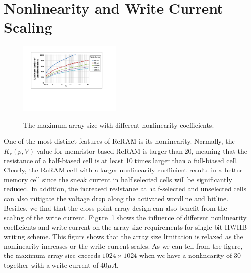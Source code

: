 \section{Nonlinearity and Write Current Scaling}\label{sec:scale}
\begin{figure}[!b]
\centering
  \includegraphics[width=0.45\textwidth]{./figures/non_linear_f}\\
  \vspace{-5pt}
  \caption{The maximum array size with different nonlinearity coefficients.}\label{fig:non_linear}
\end{figure}
One of the most distinct features of ReRAM is its nonlinearity. Normally,
the $K_r(p,V)$ value for memristor-based ReRAM is larger than 20, meaning
that the resistance of a half-biased cell is at least 10 times larger than
a full-biased cell. Clearly, the ReRAM cell with a larger nonlinearity
coefficient results in a better memory cell since the sneak current in
half selected cells will be significantly reduced. In addition, the
increased resistance at half-selected and unselected cells can also
mitigate the voltage drop along the activated wordline and bitline.
Besides, we find that the cross-point array design can also benefit from
the scaling of the write current. Figure~\ref{fig:non_linear} shows the
influence of different nonlinearity coefficients and write current on the
array size requirements for single-bit HWHB writing scheme. This figure
shows that the array size limitation is relaxed as the nonlinearity
increases or the write current scales. As we can tell from the figure, the
maximum array size exceeds $1024\times 1024$ when we have a nonlinearity
of $30$ together with a write current of $40\mu A$.

